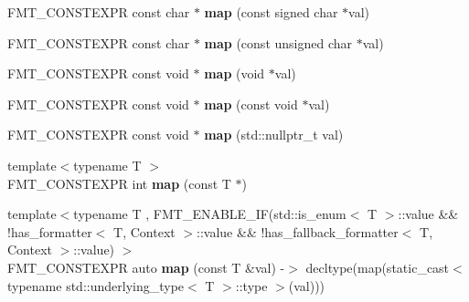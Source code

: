 \begin{DoxyCompactItemize}
\item 
\mbox{\label{structinternal_1_1arg__mapper_a7275e3ee2dfdabe312ab67536d1cceac}} 
F\+M\+T\+\_\+\+C\+O\+N\+S\+T\+E\+X\+PR const char $\ast$ {\bfseries map} (const signed char $\ast$val)
\item 
\mbox{\label{structinternal_1_1arg__mapper_aa1bf10e421e5a06a328eebed94173ab4}} 
F\+M\+T\+\_\+\+C\+O\+N\+S\+T\+E\+X\+PR const char $\ast$ {\bfseries map} (const unsigned char $\ast$val)
\item 
\mbox{\label{structinternal_1_1arg__mapper_a8ed68ed3817f4bfcf446650591245122}} 
F\+M\+T\+\_\+\+C\+O\+N\+S\+T\+E\+X\+PR const void $\ast$ {\bfseries map} (void $\ast$val)
\item 
\mbox{\label{structinternal_1_1arg__mapper_aaa2ebd44217ae1014fab3dfb8e742953}} 
F\+M\+T\+\_\+\+C\+O\+N\+S\+T\+E\+X\+PR const void $\ast$ {\bfseries map} (const void $\ast$val)
\item 
\mbox{\label{structinternal_1_1arg__mapper_a9b463e54202f3b516c107be102363e15}} 
F\+M\+T\+\_\+\+C\+O\+N\+S\+T\+E\+X\+PR const void $\ast$ {\bfseries map} (std\+::nullptr\+\_\+t val)
\item 
\mbox{\label{structinternal_1_1arg__mapper_a5a33334ae4ffc03b38e225d2248ad151}} 
{\footnotesize template$<$typename T $>$ }\\F\+M\+T\+\_\+\+C\+O\+N\+S\+T\+E\+X\+PR int {\bfseries map} (const T $\ast$)
\item 
\mbox{\label{structinternal_1_1arg__mapper_abefd336cb318a7d5e3edc2964cc17e92}} 
{\footnotesize template$<$typename T , F\+M\+T\+\_\+\+E\+N\+A\+B\+L\+E\+\_\+\+I\+F(std\+::is\+\_\+enum$<$ T $>$\+::value \&\& !has\+\_\+formatter$<$ T, Context $>$\+::value \&\& !has\+\_\+fallback\+\_\+formatter$<$ T, Context $>$\+::value) $>$ }\\F\+M\+T\+\_\+\+C\+O\+N\+S\+T\+E\+X\+PR auto {\bfseries map} (const T \&val) -\/$>$ decltype(map(static\+\_\+cast$<$ typename std\+::underlying\+\_\+type$<$ T $>$\+::type $>$(val)))
\item 
\mbox{\label{structinternal_1_1arg__mapper_a97167b7a9bec713a81632f9df2fbc2d4}} 

\end{DoxyCompactItemize}
